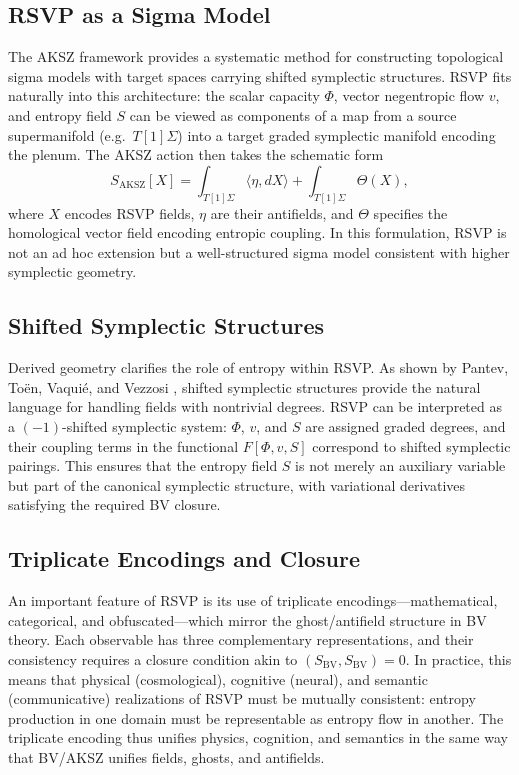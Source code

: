 \documentclass[12pt]{article}
\begin{document}
\subsection{RSVP as a Sigma Model}
The AKSZ framework provides a systematic method for constructing topological sigma models with target spaces carrying shifted symplectic structures. RSVP fits naturally into this architecture: the scalar capacity $\Phi$, vector negentropic flow $v$, and entropy field $S$ can be viewed as components of a map from a source supermanifold (e.g.\ $T[1]\Sigma$) into a target graded symplectic manifold encoding the plenum. The AKSZ action then takes the schematic form
\begin{equation}
S_{\mathrm{AKSZ}}[X] = \int_{T[1]\Sigma} \langle \eta, dX \rangle + \int_{T[1]\Sigma} \Theta(X) ,
\end{equation}
where $X$ encodes RSVP fields, $\eta$ are their antifields, and $\Theta$ specifies the homological vector field encoding entropic coupling. In this formulation, RSVP is not an ad hoc extension but a well-structured sigma model consistent with higher symplectic geometry.

\subsection{Shifted Symplectic Structures}
Derived geometry clarifies the role of entropy within RSVP. As shown by Pantev, Toën, Vaquié, and Vezzosi \cite{Pantev:2011ns}, shifted symplectic structures provide the natural language for handling fields with nontrivial degrees. RSVP can be interpreted as a $(-1)$-shifted symplectic system: $\Phi$, $v$, and $S$ are assigned graded degrees, and their coupling terms in the functional $F[\Phi,v,S]$ correspond to shifted symplectic pairings. This ensures that the entropy field $S$ is not merely an auxiliary variable but part of the canonical symplectic structure, with variational derivatives satisfying the required BV closure.

\subsection{Triplicate Encodings and Closure}
An important feature of RSVP is its use of triplicate encodings—mathematical, categorical, and obfuscated—which mirror the ghost/antifield structure in BV theory. Each observable has three complementary representations, and their consistency requires a closure condition akin to $(S_{\mathrm{BV}},S_{\mathrm{BV}})=0$. In practice, this means that physical (cosmological), cognitive (neural), and semantic (communicative) realizations of RSVP must be mutually consistent: entropy production in one domain must be representable as entropy flow in another. The triplicate encoding thus unifies physics, cognition, and semantics in the same way that BV/AKSZ unifies fields, ghosts, and antifields.
\end{document}
